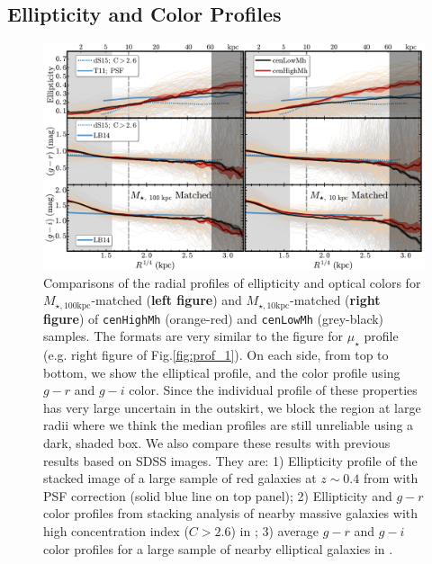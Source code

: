 \documentclass{emulateapj}
\def\rbcg{\texttt{cenHighMh}}
\def\nbcg{\texttt{cenLowMh}}
\def\minn{{$M_{\star,10\mathrm{kpc}}$}}
\def\mtot{{$M_{\star,100\mathrm{kpc}}$}}
\def\mden{{$\mu_{\star}$}}
\begin{document}
\begin{CJK*}{UTF8}{gbsn}
\subsection{Ellipticity and Color Profiles}
    \label{ssec:ell_color}
       
  \begin{figure}[t!]
      \centering 
      \includegraphics[width=\textwidth]{fig/redbcg_discussion_2}
      \caption{
          Comparisons of the radial profiles of ellipticity and optical colors 
      	  for \mtot{}-matched (\textbf{left figure}) and \minn{}-matched 
      	  (\textbf{right figure}) of \rbcg{} (orange-red) and \nbcg{} (grey-black) samples. 
          The formats are very similar to the figure for \mden{} profile 
          (e.g. right figure of Fig.\ref{fig:prof_1}). 
          On each side, from top to bottom, we show the elliptical profile, and the 
          color profile using $g-r$ and $g-i$ color. 
          Since the individual profile of these properties has very large uncertain in the 
          outskirt, we block the region at large radii where we think the median profiles 
          are still unreliable using a dark, shaded box.
          We also compare these results with previous results based on SDSS images. 
          They are: 
          1) Ellipticity profile of the stacked image of a large sample of red galaxies at 
          $z\sim 0.4$ from \citet{Tal2011} with PSF correction 
          (solid blue line on top panel); 
          2) Ellipticity and $g-r$ color profiles from stacking analysis of nearby massive 
          galaxies with high concentration index ($C>2.6$) in \citet[][blue dash lines 
          on the top and middle panels]{DSouza2014}; 
          3) average $g-r$ and $g-i$ color profiles for a large sample of nearby 
          elliptical galaxies in \citet[][blue, solid lines on the middle and bottom 
          panels]{LaBarbera2010}.
          }
      \label{fig:ell_color}
  \end{figure}
    

\end{CJK*}
\end{document}
